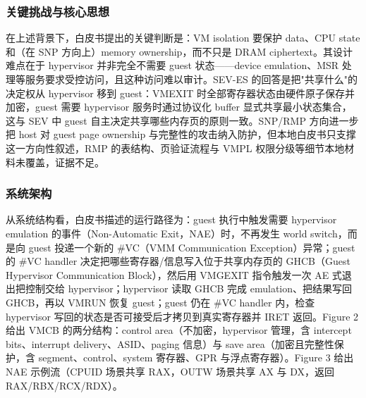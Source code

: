 \documentclass[11pt]{ctexart}
\begin{document}
\subsubsection{关键挑战与核心思想}
在上述背景下，白皮书提出的关键判断是：VM isolation 要保护 data、CPU state 和（在 SNP 方向上）memory ownership，而不只是 DRAM ciphertext。其设计难点在于 hypervisor 并非完全不需要 guest 状态——device emulation、MSR 处理等服务要求受控访问，且这种访问难以审计。SEV-ES 的回答是把"共享什么"的决定权从 hypervisor 移到 guest：VMEXIT 时全部寄存器状态由硬件原子保存并加密，guest 需要 hypervisor 服务时通过协议化 buffer 显式共享最小状态集合，这与 SEV 中 guest 自主决定共享哪些内存页的原则一致。SNP/RMP 方向进一步把 host 对 guest page ownership 与完整性的攻击纳入防护，但本地白皮书只支撑这一方向性叙述，RMP 的表结构、页验证流程与 VMPL 权限分级等细节本地材料未覆盖，证据不足。\par
\subsubsection{系统架构}
从系统结构看，白皮书描述的运行路径为：guest 执行中触发需要 hypervisor emulation 的事件（Non-Automatic Exit，NAE）时，不再发生 world switch，而是向 guest 投递一个新的 \#VC（VMM Communication Exception）异常；guest 的 \#VC handler 决定把哪些寄存器/信息写入位于共享内存页的 GHCB（Guest Hypervisor Communication Block），然后用 VMGEXIT 指令触发一次 AE 式退出把控制交给 hypervisor；hypervisor 读取 GHCB 完成 emulation、把结果写回 GHCB，再以 VMRUN 恢复 guest；guest 仍在 \#VC handler 内，检查 hypervisor 写回的状态是否可接受后才拷贝到真实寄存器并 IRET 返回。Figure 2 给出 VMCB 的两分结构：control area（不加密，hypervisor 管理，含 intercept bits、interrupt delivery、ASID、paging 信息）与 save area（加密且完整性保护，含 segment、control、system 寄存器、GPR 与浮点寄存器）。Figure 3 给出 NAE 示例流（CPUID 场景共享 RAX，OUTW 场景共享 AX 与 DX，返回 RAX/RBX/RCX/RDX）。\par
\end{document}
